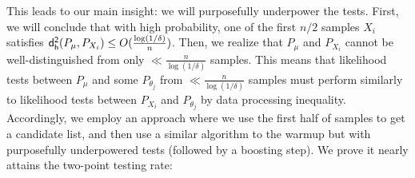 This leads to our main insight: we will purposefully underpower the tests. First, we will conclude that with high probability, one of the first $n/2$ samples $X_i$ satisfies $\mathsf{d_{h}^2}(P_\mu,P_{X_i}) \le O(\frac{\log(1/\delta)}{n})$. Then, we realize that $P_\mu$ and $P_{X_i}$ cannot be well-distinguished from only $\ll \frac{n}{\log(1/\delta)}$ samples. This means that likelihood tests between $P_\mu$ and some $P_{\theta_j}$ from $\ll \frac{n}{\log(1/\delta)}$ samples must perform similarly to likelihood tests between $P_{X_i}$ and $P_{\theta_j}$ by data processing inequality. Accordingly, we employ an approach where we use the first half of samples to get a candidate list, and then use a similar algorithm to the warmup but with purposefully underpowered tests (followed by a boosting step). We prove it nearly attains the two-point testing rate:


